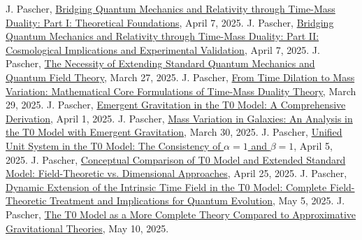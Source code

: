 \documentclass[12pt,a4paper]{article}
\begin{document}
	
	\begin{thebibliography}{99}
		 J. Pascher, \href{https://github.com/jpascher/T0-Time-Mass-Duality/tree/main/2/pdf/English/QMRelTimeMassPart1En.pdf}{Bridging Quantum Mechanics and Relativity through Time-Mass Duality: Part I: Theoretical Foundations}, April 7, 2025.
		 J. Pascher, \href{https://github.com/jpascher/T0-Time-Mass-Duality/tree/main/2/pdf/English/QMRelTimeMassPart2En.pdf}{Bridging Quantum Mechanics and Relativity through Time-Mass Duality: Part II: Cosmological Implications and Experimental Validation}, April 7, 2025.
		 J. Pascher, \href{https://github.com/jpascher/T0-Time-Mass-Duality/tree/main/2/pdf/English/NotwendigkeitQMErweiterungEn.pdf}{The Necessity of Extending Standard Quantum Mechanics and Quantum Field Theory}, March 27, 2025.
		 J. Pascher, \href{https://github.com/jpascher/T0-Time-Mass-Duality/tree/main/2/pdf/English/MathZeitMasseLagrangeEn.pdf}{From Time Dilation to Mass Variation: Mathematical Core Formulations of Time-Mass Duality Theory}, March 29, 2025.
		 J. Pascher, \href{https://github.com/jpascher/T0-Time-Mass-Duality/tree/main/2/pdf/English/EmergentGravT0En.pdf}{Emergent Gravitation in the T0 Model: A Comprehensive Derivation}, April 1, 2025.
		 J. Pascher, \href{https://github.com/jpascher/T0-Time-Mass-Duality/tree/main/2/pdf/English/MassVarGalaxienEn.pdf}{Mass Variation in Galaxies: An Analysis in the T0 Model with Emergent Gravitation}, March 30, 2025.
		 J. Pascher, \href{https://github.com/jpascher/T0-Time-Mass-Duality/tree/main/2/pdf/English/Alpha1Beta1KonsistenzEn.pdf}{Unified Unit System in the T0 Model: The Consistency of $\alpha = 1$ and $\beta = 1$}, April 5, 2025.
		 J. Pascher, \href{https://github.com/jpascher/T0-Time-Mass-Duality/tree/main/2/pdf/English/T0vsESM_ConceptualAnalysisEn.pdf}{Conceptual Comparison of T0 Model and Extended Standard Model: Field-Theoretic vs. Dimensional Approaches}, April 25, 2025.
		 J. Pascher, \href{https://github.com/jpascher/T0-Time-Mass-Duality/tree/main/2/pdf/English/DynamicTF-SchrodingerExtensions_En.pdf}{Dynamic Extension of the Intrinsic Time Field in the T0 Model: Complete Field-Theoretic Treatment and Implications for Quantum Evolution}, May 5, 2025.
		 J. Pascher, \href{https://github.com/jpascher/T0-Time-Mass-Duality/tree/main/2/pdf/English/T0-ModelAsCompleteTheory_En.pdf}{The T0 Model as a More Complete Theory Compared to Approximative Gravitational Theories}, May 10, 2025.

\end{thebibliography}
\end{document}
